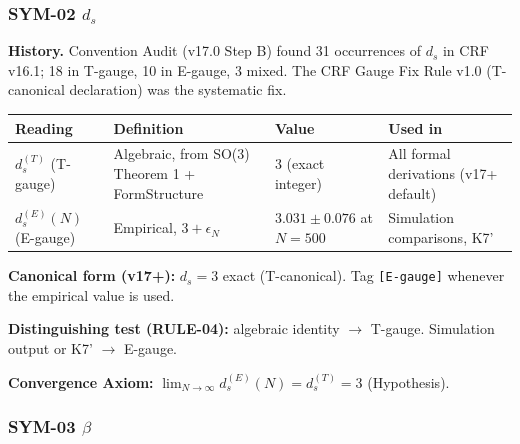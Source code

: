 \documentclass[12pt, a4paper]{article}
\begin{document}
\subsubsection*{SYM-02 \quad $d_s$}

\begin{redbox}[title={SYM-02 \textmd{---} $d_s$ \textmd{(two gauges)}}]
\textbf{History.} Convention Audit (v17.0 Step B) found 31 occurrences
of $d_s$ in CRF v16.1; 18 in T-gauge, 10 in E-gauge, 3 mixed.
The CRF Gauge Fix Rule v1.0 (T-canonical declaration) was the
systematic fix.

\medskip
\renewcommand{\arraystretch}{1.35}
\begin{tabular}{p{2.8cm} p{4.0cm} p{2.0cm} p{3.5cm}}
\toprule
\textbf{Reading} & \textbf{Definition} &
\textbf{Value} & \textbf{Used in}\\
\midrule
$d_s^{(T)}$ (T-gauge) &
  Algebraic, from SO(3) Theorem 1 + FormStructure &
  $3$ (exact integer) &
  All formal derivations (v17+ default)\\
$d_s^{(E)}(N)$ (E-gauge) &
  Empirical, $3+\epsilon_N$ &
  $3.031\pm 0.076$ at $N{=}500$ &
  Simulation comparisons, K7'\\
\bottomrule
\end{tabular}

\medskip
\textbf{Canonical form (v17+):} $d_s = 3$ exact (T-canonical).
Tag \texttt{[E-gauge]} whenever the empirical value is used.

\textbf{Distinguishing test (RULE-04):} algebraic identity $\to$
T-gauge. Simulation output or K7' $\to$ E-gauge.

\textbf{Convergence Axiom:} $\lim_{N\to\infty}d_s^{(E)}(N)
= d_s^{(T)} = 3$ (Hypothesis).
\end{redbox}

\subsubsection*{SYM-03 \quad $\beta$}
\end{document}
